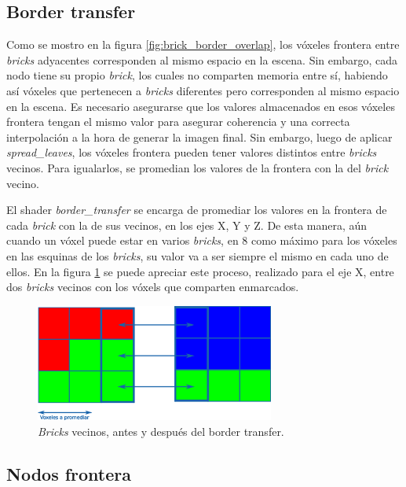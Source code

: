 \subsection{Border transfer}\label{sec:border_transfer}

Como se mostro en la figura \ref{fig:brick_border_overlap}, los vóxeles frontera entre \textit{bricks} adyacentes corresponden al mismo espacio en la escena.
Sin embargo, cada nodo tiene su propio \textit{brick}, los cuales no comparten memoria entre sí, habiendo así vóxeles que pertenecen a \textit{bricks} diferentes pero corresponden al mismo espacio en la escena.
Es necesario asegurarse que los valores almacenados en esos vóxeles frontera tengan el mismo valor para asegurar coherencia y una correcta interpolación a la hora de generar la imagen final.
Sin embargo, luego de aplicar \textit{spread\_leaves}, los vóxeles frontera pueden tener valores distintos entre \textit{bricks} vecinos.
Para igualarlos, se promedian los valores de la frontera con la del \textit{brick} vecino.

El shader \textit{border\_transfer} se encarga de promediar los valores en la frontera de cada \textit{brick} con la de sus vecinos, en los ejes X, Y y Z.
De esta manera, aún cuando un vóxel puede estar en varios \textit{bricks}, en $8$ como máximo para los vóxeles en las esquinas de los \textit{bricks}, su valor va a ser siempre el mismo en cada uno de ellos. %
En la figura \ref{fig:border_transfer} se puede apreciar este proceso, realizado para el eje X, entre dos \textit{bricks} vecinos con los vóxels que comparten enmarcados.

\begin{figure}[h!]
    \centering
    \includegraphics[width=0.7\textwidth]{border-transfer.png}
    \caption{\textit{Bricks} vecinos, antes y después del border transfer.}
    \label{fig:border_transfer}
\end{figure}

\subsection{Nodos frontera}

